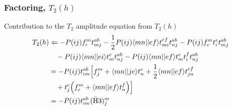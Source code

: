 \begin{frame}
    \frametitle{Factoring, $T_2(h)$}

\begin{block}{Contribution to the $\hat{T}_2$ amplitude equation from $T_2(h)$}
\begin{align*}
    T_2(h) & \Leftarrow 
        - P(ij) f_{i}^m t_{mj}^{ab}
        - \frac{1}{2} P(ij) \langle mn||ef\rangle t_{mi}^{ef} t_{nj}^{ab}
        - P(ij) f_{e}^m t_i^e t_{mj}^{ab} \notag \\
        & \quad - P(ij) \langle mn||ei\rangle t_m^e t_{nj}^{ab}
        - P(ij) \langle mn||ef\rangle t_m^e t_i^f t_{nj}^{ab} \notag \\
    & = - P(ij) t_{im}^{ab} \Bigl[ 
        f_j^m 
        + \langle mn||je\rangle t_n^e
        + \frac{1}{2} \langle mn||ef\rangle  t_{jn}^{ef} \notag \\
        & \quad + t_j^e \Bigl(
            f_e^m 
            + \langle mn||ef\rangle t_n^f
        \Bigr)
    \Bigr] \notag \\
    & = - P(ij) t_{im}^{ab} (\mathrm{\bar{H}3})_j^m
\end{align*}

\end{block}
\end{frame}


